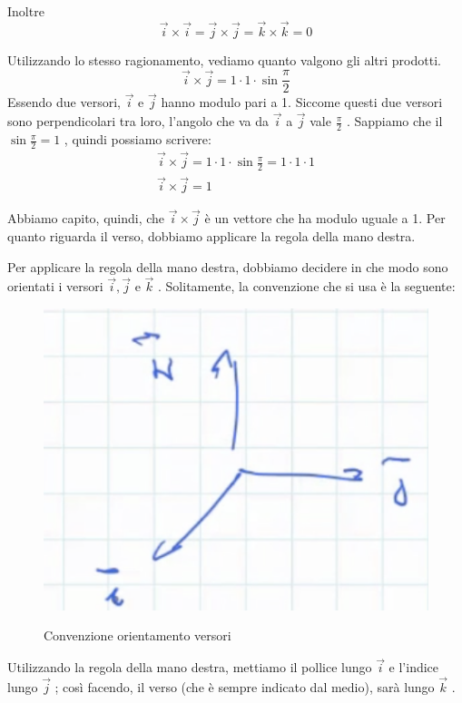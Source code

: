 Inoltre
$$ \overrightarrow{i} \times \overrightarrow{i} = \overrightarrow{j} \times \overrightarrow{j} = \overrightarrow{k} \times \overrightarrow{k} = 0 $$

Utilizzando lo stesso ragionamento, vediamo quanto valgono gli altri prodotti.
$$ \overrightarrow{i} \times \overrightarrow{j} = 1 \cdot 1 \cdot \sin \frac{\pi}{2} $$
Essendo due versori, $ \overrightarrow{i} $ e $ \overrightarrow{j} $ hanno modulo pari a 1. Siccome questi due versori sono perpendicolari tra loro, l'angolo che va da $\overrightarrow{i} $ a $\overrightarrow{j} $ vale $ \frac{\pi}{2} $ .  Sappiamo che il $ \sin \frac{\pi}{2} = 1 $ , quindi possiamo scrivere:
\begin{align*}
\overrightarrow{i} \times \overrightarrow{j} = 1 \cdot 1 \cdot \sin \frac{\pi}{2} = 1 \cdot 1 \cdot 1 \\
\overrightarrow{i} \times \overrightarrow{j} = 1
\end{align*}

Abbiamo capito, quindi, che $ \overrightarrow{i} \times \overrightarrow{j} $ è un vettore che ha modulo uguale a 1. Per quanto riguarda il verso, dobbiamo applicare la regola della mano destra.

Per applicare la regola della mano destra, dobbiamo decidere in che modo sono orientati i versori $ \overrightarrow{i} , \overrightarrow{j} $ e $ \overrightarrow{k} $ . Solitamente, la convenzione che si usa è la seguente:

\begin{figure}[h]
\begin{center}
\includegraphics[width = 0.5 \textwidth]{lezione1/images/convenzione versori}
\label{fig:convenzione}
\caption{Convenzione orientamento versori}
\end{center}
\end{figure}

Utilizzando la regola della mano destra, mettiamo il pollice lungo $ \overrightarrow{i} $ e l'indice lungo $ \overrightarrow{j} $ ; così facendo, il verso (che è sempre indicato dal medio), sarà lungo $ \overrightarrow{k} $ .

